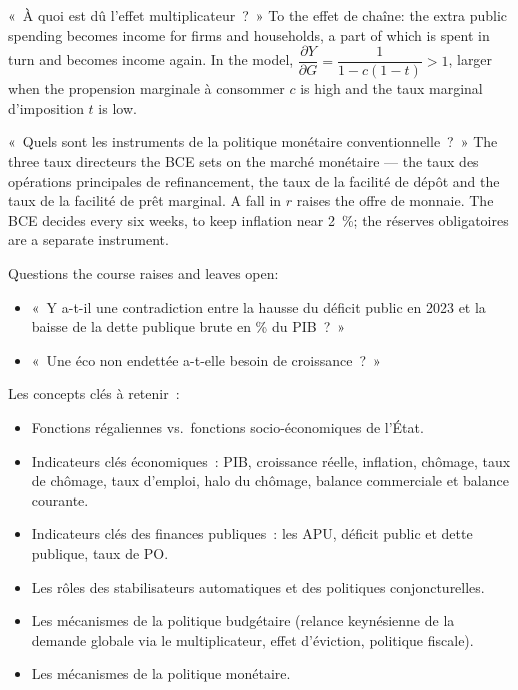 \begin{example}
  «~À quoi est dû l'effet multiplicateur~?~» To the effet de chaîne: the extra
  public spending becomes income for firms and households, a part of which is
  spent in turn and becomes income again. In the model,
  $\dfrac{\partial Y}{\partial G} = \dfrac{1}{1 - c(1 - t)} > 1$, larger when the
  propension marginale à consommer $c$ is high and the taux marginal
  d'imposition $t$ is low.
\end{example}

\begin{example}
  «~Quels sont les instruments de la politique monétaire conventionnelle~?~» The
  three taux directeurs the BCE sets on the marché monétaire --- the taux des
  opérations principales de refinancement, the taux de la facilité de dépôt and
  the taux de la facilité de prêt marginal. A fall in $r$ raises the offre de
  monnaie. The BCE decides every six weeks, to keep inflation near 2~\%; the
  réserves obligatoires are a separate instrument.
\end{example}

\begin{remark}
  Questions the course raises and leaves open:
  \begin{itemize}
    \item «~Y a-t-il une contradiction entre la hausse du déficit public en 2023
      et la baisse de la dette publique brute en \% du PIB~?~»
    \item «~Une éco non endettée a-t-elle besoin de croissance~?~»
  \end{itemize}
\end{remark}

\begin{remark}
  Les concepts clés à retenir~:
  \begin{itemize}
    \item Fonctions régaliennes vs.\ fonctions socio-économiques de l'État.
    \item Indicateurs clés économiques~: PIB, croissance réelle, inflation,
      chômage, taux de chômage, taux d'emploi, halo du chômage, balance
      commerciale et balance courante.
    \item Indicateurs clés des finances publiques~: les APU, déficit public et
      dette publique, taux de PO.
    \item Les rôles des stabilisateurs automatiques et des politiques
      conjoncturelles.
    \item Les mécanismes de la politique budgétaire (relance keynésienne de la
      demande globale via le multiplicateur, effet d'éviction, politique
      fiscale).
    \item Les mécanismes de la politique monétaire.
  \end{itemize}
\end{remark}
